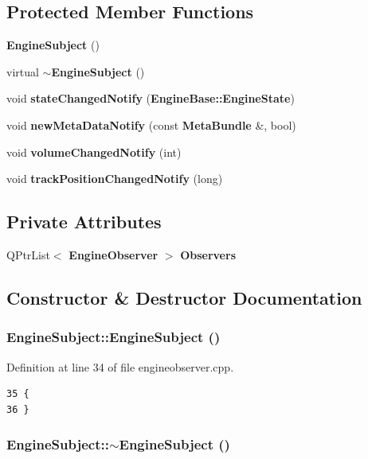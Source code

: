 \subsection*{Protected Member Functions}
\begin{CompactItemize}
\item 
{\bf Engine\-Subject} ()
\item 
virtual {\bf $\sim$Engine\-Subject} ()
\item 
void {\bf state\-Changed\-Notify} ({\bf Engine\-Base::Engine\-State})
\item 
void {\bf new\-Meta\-Data\-Notify} (const {\bf Meta\-Bundle} \&, bool)
\item 
void {\bf volume\-Changed\-Notify} (int)
\item 
void {\bf track\-Position\-Changed\-Notify} (long)
\end{CompactItemize}
\subsection*{Private Attributes}
\begin{CompactItemize}
\item 
QPtr\-List$<$ {\bf Engine\-Observer} $>$ {\bf Observers}
\end{CompactItemize}


\subsection{Constructor \& Destructor Documentation}
\subsubsection{\setlength{\rightskip}{0pt plus 5cm}Engine\-Subject::Engine\-Subject ()\hspace{0.3cm}{\tt  [protected]}}\label{classEngineSubject_EngineSubjectb0}




Definition at line 34 of file engineobserver.cpp.



\footnotesize\begin{verbatim}35 {
36 }
\end{verbatim}\normalsize 
{}
\subsubsection{\setlength{\rightskip}{0pt plus 5cm}Engine\-Subject::$\sim${\bf Engine\-Subject} ()\hspace{0.3cm}{\tt  [protected, virtual]}}\label{classEngineSubject_EngineSubjectb1}




